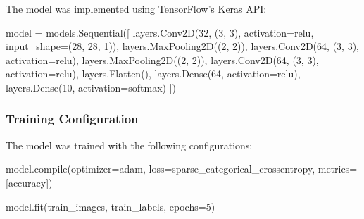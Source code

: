 \documentclass[
  9pt,
  letterpaper,
  abstract,
  titlepage]{scrbook}
\newenvironment{Shaded}{\begin{snugshade}}{\end{snugshade}}
\newcommand{\BuiltInTok}[1]{\textcolor[rgb]{0.00,0.23,0.31}{#1}}
\newcommand{\DecValTok}[1]{\textcolor[rgb]{0.68,0.00,0.00}{#1}}
\newcommand{\NormalTok}[1]{\textcolor[rgb]{0.00,0.23,0.31}{#1}}
\newcommand{\OperatorTok}[1]{\textcolor[rgb]{0.37,0.37,0.37}{#1}}
\newcommand{\StringTok}[1]{\textcolor[rgb]{0.13,0.47,0.30}{#1}}
\begin{document}
The model was implemented using TensorFlow's Keras API:

\begin{Shaded}
\begin{Highlighting}[]
\NormalTok{model }\OperatorTok{=}\NormalTok{ models.Sequential([}
\NormalTok{    layers.Conv2D(}\DecValTok{32}\NormalTok{, (}\DecValTok{3}\NormalTok{, }\DecValTok{3}\NormalTok{), activation}\OperatorTok{=}\StringTok{\textquotesingle{}relu\textquotesingle{}}\NormalTok{, input\_shape}\OperatorTok{=}\NormalTok{(}\DecValTok{28}\NormalTok{, }\DecValTok{28}\NormalTok{, }\DecValTok{1}\NormalTok{)),}
\NormalTok{    layers.MaxPooling2D((}\DecValTok{2}\NormalTok{, }\DecValTok{2}\NormalTok{)),}
\NormalTok{    layers.Conv2D(}\DecValTok{64}\NormalTok{, (}\DecValTok{3}\NormalTok{, }\DecValTok{3}\NormalTok{), activation}\OperatorTok{=}\StringTok{\textquotesingle{}relu\textquotesingle{}}\NormalTok{),}
\NormalTok{    layers.MaxPooling2D((}\DecValTok{2}\NormalTok{, }\DecValTok{2}\NormalTok{)),}
\NormalTok{    layers.Conv2D(}\DecValTok{64}\NormalTok{, (}\DecValTok{3}\NormalTok{, }\DecValTok{3}\NormalTok{), activation}\OperatorTok{=}\StringTok{\textquotesingle{}relu\textquotesingle{}}\NormalTok{),}
\NormalTok{    layers.Flatten(),}
\NormalTok{    layers.Dense(}\DecValTok{64}\NormalTok{, activation}\OperatorTok{=}\StringTok{\textquotesingle{}relu\textquotesingle{}}\NormalTok{),}
\NormalTok{    layers.Dense(}\DecValTok{10}\NormalTok{, activation}\OperatorTok{=}\StringTok{\textquotesingle{}softmax\textquotesingle{}}\NormalTok{)}
\NormalTok{])}
\end{Highlighting}
\end{Shaded}

\subsubsection{Training Configuration}\label{training-configuration}

The model was trained with the following configurations:

\begin{Shaded}
\begin{Highlighting}[]
\NormalTok{model.}\BuiltInTok{compile}\NormalTok{(optimizer}\OperatorTok{=}\StringTok{\textquotesingle{}adam\textquotesingle{}}\NormalTok{,}
\NormalTok{              loss}\OperatorTok{=}\StringTok{\textquotesingle{}sparse\_categorical\_crossentropy\textquotesingle{}}\NormalTok{,}
\NormalTok{              metrics}\OperatorTok{=}\NormalTok{[}\StringTok{\textquotesingle{}accuracy\textquotesingle{}}\NormalTok{])}

\NormalTok{model.fit(train\_images, train\_labels, epochs}\OperatorTok{=}\DecValTok{5}\NormalTok{)}
\end{Highlighting}
\end{Shaded}
\end{document}
